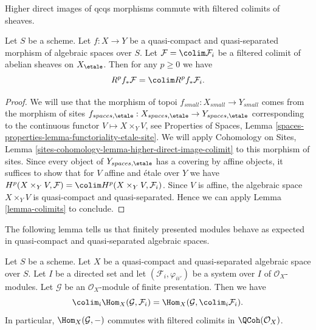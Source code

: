 \begin{lemma}
\label{lemma-colimit-cohomology}
\begin{slogan}
Higher direct images of qcqs morphisms commute with filtered colimits
of sheaves.
\end{slogan}
Let $S$ be a scheme. Let $f : X \to Y$ be a quasi-compact and quasi-separated
morphism of algebraic spaces over $S$. Let $\mathcal{F} = \colim \mathcal{F}_i$
be a filtered colimit of abelian sheaves on $X_\etale$.
Then for any $p \geq 0$ we have
$$
R^pf_*\mathcal{F} = \colim R^pf_*\mathcal{F}_i.
$$
\end{lemma}

\begin{proof}
We will use that the morphism of topoi $f_{small} : X_{small} \to Y_{small}$
comes from the morphism of sites
$f_{spaces, \etale} : X_{spaces, \etale} \to Y_{spaces, \etale}$
corresponding to the continuous functor $V \longmapsto X \times_Y V$,
see Properties of Spaces, Lemma
\ref{spaces-properties-lemma-functoriality-etale-site}.
We will apply Cohomology on Sites, Lemma
\ref{sites-cohomology-lemma-higher-direct-image-colimit}
to this morphism of sites. Since every object of $Y_{spaces, \etale}$
has a covering by affine objects, it suffices to show that
for $V$ affine and \'etale over $Y$ we have
$H^p(X \times_Y V, \mathcal{F}) = \colim H^p(X \times_Y V, \mathcal{F}_i)$.
Since $V$ is affine, the algebraic space $X \times_Y V$ is
quasi-compact and quasi-separated.
Hence we can apply Lemma \ref{lemma-colimits}
to conclude.
\end{proof}

\noindent
The following lemma tells us that finitely presented modules behave
as expected in quasi-compact and quasi-separated algebraic spaces.

\begin{lemma}
\label{lemma-finite-presentation-quasi-compact-colimit}
Let $S$ be a scheme. Let $X$ be a quasi-compact and quasi-separated
algebraic space over $S$. Let $I$ be a directed set and
let $(\mathcal{F}_i, \varphi_{ii'})$ be a system over $I$
of $\mathcal{O}_X$-modules. Let $\mathcal{G}$ be an
$\mathcal{O}_X$-module of finite presentation. Then we have
$$
\colim_i \Hom_X(\mathcal{G}, \mathcal{F}_i)
=
\Hom_X(\mathcal{G}, \colim_i \mathcal{F}_i).
$$
In particular, $\Hom_X(\mathcal{G}, -)$ commutes with filtered
colimits in $\QCoh(\mathcal{O}_X)$.
\end{lemma}

